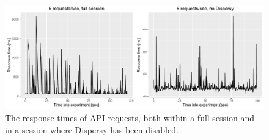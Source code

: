 \begin{figure}[h!]
	\centering
	\includegraphics[width=1.0\columnwidth]{images/experiments/request_times_comparison}
	\caption{The response times of API requests, both within a full session and in a session where Dispersy has been disabled.}
	\label{fig:api-performance}
\end{figure}

